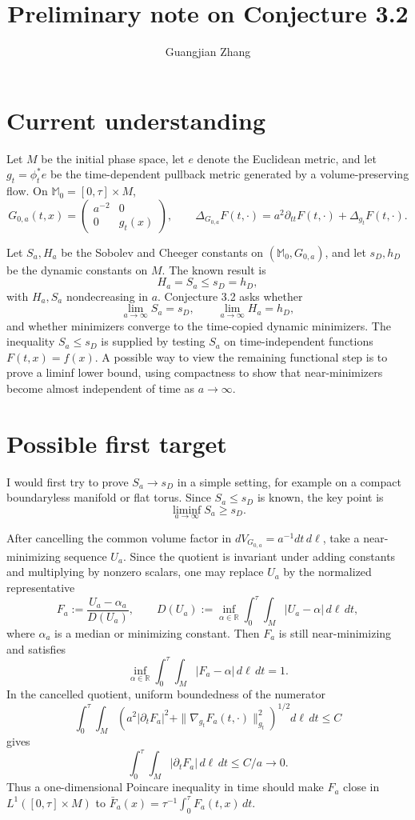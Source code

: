 \documentclass[10pt]{article}
\title{\vspace{-2.5em}Preliminary note on Conjecture 3.2}
\author{Guangjian Zhang}
\date{}
\begin{document}
\maketitle
\vspace{-3em}
\small

\section*{Current understanding}

Let \(M\) be the initial phase space, let \(e\) denote the Euclidean metric, and let \(g_t=\phi_t^*e\) be the time-dependent pullback metric generated by a volume-preserving flow. On \(\mathbb M_0=[0,\tau]\times M\),
\[
G_{0,a}(t,x)=
\begin{pmatrix}a^{-2}&0\\0&g_t(x)\end{pmatrix},
\qquad
\Delta_{G_{0,a}}F(t,\cdot)=a^2\partial_{tt}F(t,\cdot)+\Delta_{g_t}F(t,\cdot).
\]

Let \(S_a,H_a\) be the Sobolev and Cheeger constants on \((\mathbb M_0,G_{0,a})\), and let \(s_D,h_D\) be the dynamic constants on \(M\). The known result is
\[
H_a=S_a\le s_D=h_D,
\]
with \(H_a,S_a\) nondecreasing in \(a\). Conjecture 3.2 asks whether
\[
\lim_{a\to\infty}S_a=s_D,\qquad
\lim_{a\to\infty}H_a=h_D,
\]
and whether minimizers converge to the time-copied dynamic minimizers. The inequality \(S_a\le s_D\) is supplied by testing \(S_a\) on time-independent functions \(F(t,x)=f(x)\). A possible way to view the remaining functional step is to prove a liminf lower bound, using compactness to show that near-minimizers become almost independent of time as \(a\to\infty\).

\section*{Possible first target}

I would first try to prove \(S_a\to s_D\) in a simple setting, for example on a compact boundaryless manifold or flat torus. Since \(S_a\le s_D\) is known, the key point is
\[
\liminf_{a\to\infty}S_a\ge s_D.
\]

After cancelling the common volume factor in \(dV_{G_{0,a}}=a^{-1}dt\,d\ell\), take a near-minimizing sequence \(U_a\). Since the quotient is invariant under adding constants and multiplying by nonzero scalars, one may replace \(U_a\) by the normalized representative
\[
F_a:=\frac{U_a-\alpha_a}{D(U_a)},
\qquad
D(U_a):=\inf_{\alpha\in\mathbb R}\int_0^\tau\int_M |U_a-\alpha|\,d\ell\,dt,
\]
where \(\alpha_a\) is a median or minimizing constant. Then \(F_a\) is still near-minimizing and satisfies
\[
\inf_{\alpha\in\mathbb R}\int_0^\tau\int_M |F_a-\alpha|\,d\ell\,dt=1.
\]
In the cancelled quotient, uniform boundedness of the numerator
\[
\int_0^\tau\int_M
\left(a^2|\partial_tF_a|^2+\|\nabla_{g_t}F_a(t,\cdot)\|_{g_t}^2\right)^{1/2}
d\ell\,dt
\le C
\]
gives
\[
\int_0^\tau\int_M|\partial_tF_a|\,d\ell\,dt\le C/a\to0.
\]
Thus a one-dimensional Poincare inequality in time should make \(F_a\) close in \(L^1([0,\tau]\times M)\) to \(\bar F_a(x)=\tau^{-1}\int_0^\tau F_a(t,x)\,dt\).
\end{document}
